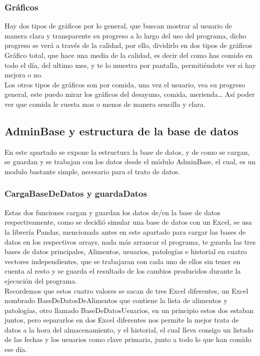 \subsubsection{Gráficos}
Hay dos tipos de gráficos por lo general, que buscan mostrar al usuario de manera clara y transparente su progreso a lo largo del uso del programa, dicho progreso se verá a través de la calidad, por ello, dividirlo en dos tipos de gráficos
Gráfico total, que hace una media de la calidad, es decir del como has comido en todo el día, del ultimo mes, y te lo muestra por pantalla, permitiéndote ver si hay mejora o no.\\

Los otros tipos de gráficos son por comida, una vez el usuario, vea su progreso general, este puedo mirar los gráficos del desayuno, comida, merienda… Así poder ver que comida le cuesta mas o menos de manera sencilla y clara.\\

\subsection{AdminBase y estructura de la base de datos}
En este apartado se expone la estructura la base de datos, y de como se cargan, se guardan y se trabajan con los datos desde el módulo AdminBase, el cual, es un modulo bastante simple, necesario para el trato de datos.
\subsubsection{CargaBaseDeDatos y guardaDatos}
Estas dos funciones cargan y guardan los datos de/en la base de datos respectivamente, como se decidió simular una base de datos con un Excel, se usa la librería Pandas, mencionada antes en este apartado para cargar las bases de datos en los respectivos arrays, nada más arrancar el programa, te guarda las tres bases de datos principales, Alimentos, usuarios, patologías e historial en cuatro vectores independientes, que se trabajaran con cada uno de ellos sin tener en cuenta al resto y se guarda el resultado de los cambios producidos durante la ejecución del programa. \\

Recordemos que estos cuatro valores se sacan de tres Excel diferentes, un Excel nombrado BaseDeDatosDeAlimentos que contiene la lista de alimentos y patologías, otro llamado BaseDeDatosUsuarios, en un principio estos dos estaban juntos, pero separarlos en dos Excel diferentes nos permite la mejor trata de datos a la hora del almacenamiento, y el historial, el cual lleva consigo un listado de las fechas y los usuarios como clave primaria, junto a todo lo que han comido ese día.\\

